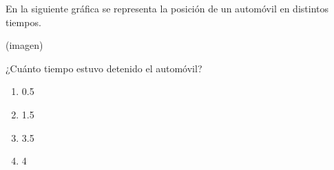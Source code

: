 \begin{problem}
    En la siguiente gráfica se representa la posición de un automóvil en distintos tiempos.

    \begin{center}
    (imagen)
    \end{center}

    ¿Cuánto tiempo estuvo detenido el automóvil?

    \begin{enumerate}[label=\Alph*.]
        \item 0.5\,
        \item 1.5\,
        \item 3.5\,
        \item 4\,
    \end{enumerate}
\end{problem}
